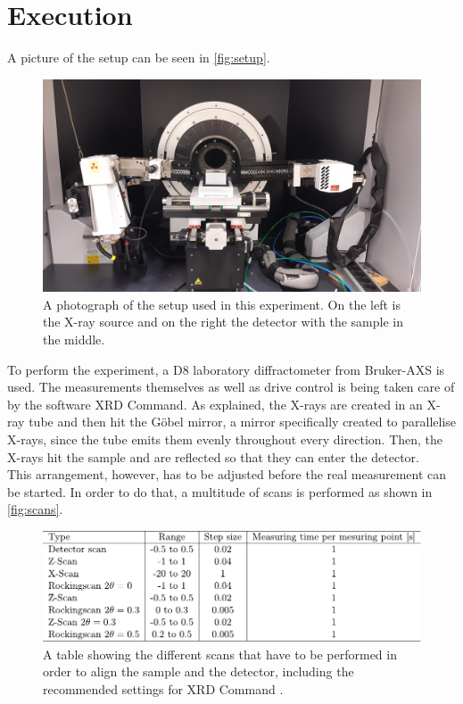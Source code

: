 \section{Execution}
\label{sec:execution}

A picture of the setup can be seen in \autoref{fig:setup}.

\begin{figure}[H]
    \centering
    \includegraphics[width = .8\textwidth]{figures/aufbau.jpg}
    \caption{A photograph of the setup used in this experiment. On the left is the X-ray source and on the right the detector with the sample in the middle.}
    \label{fig:setup}
\end{figure}

To perform the experiment, a D8 laboratory diffractometer from Bruker-AXS is used.
The measurements themselves as well as drive control is being taken care of by the software XRD Command.
As explained, the X-rays are created in an X-ray tube and then hit the Göbel mirror, 
a mirror specifically created to parallelise X-rays, since the tube emits them evenly throughout every direction.
Then, the X-rays hit the sample and are reflected so that they can enter the detector. \\

This arrangement, however, has to be adjusted before the real measurement can be started.
In order to do that, a multitude of scans is performed as shown in \autoref{fig:scans}.

\begin{figure}[H]
    \centering
    \includegraphics{figures/scans.pdf}
    \caption{A table showing the different scans that have to be performed in order to align the sample and the detector, 
    including the recommended settings for XRD Command \cite{v44}.}
    \label{fig:scans}
\end{figure}

